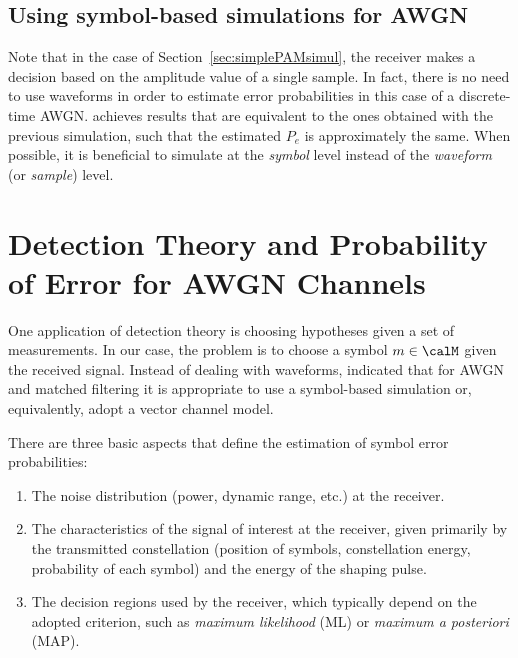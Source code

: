 \subsection{Using symbol-based simulations for AWGN}

Note that in the case of Section~\ref{sec:simplePAMsimul}, the receiver makes a decision based on the amplitude value of a single sample.
In fact, there is no need to use waveforms in order to estimate error probabilities in this case of a discrete-time AWGN.  achieves results that are equivalent to the ones obtained with the previous simulation, such that the estimated $P_e$ is approximately the same.
When possible, it is beneficial to simulate at the \emph{symbol} level instead of the \emph{waveform} (or \emph{sample}) level. 

\section{Detection Theory and Probability of Error for AWGN Channels}

One application of detection theory is choosing hypotheses given a set of measurements. In our case, the problem is to choose a symbol $m \in \calM$ given the received signal. Instead of dealing with waveforms,  indicated that for AWGN and matched filtering it is appropriate to use a symbol-based simulation or, equivalently, adopt a vector channel model.

There are three basic aspects that define the estimation of symbol error probabilities:
\begin{enumerate}
	\item The noise distribution (power, dynamic range, etc.) at the receiver.
	\item The characteristics of the signal of interest at the receiver, given primarily by the transmitted constellation (position of symbols, constellation energy, probability of each symbol) and the energy of the shaping pulse.
	\item The decision regions used by the receiver, which typically depend on the adopted criterion, such as \emph{maximum likelihood} (ML) or \emph{maximum a posteriori} (MAP).
\end{enumerate}

